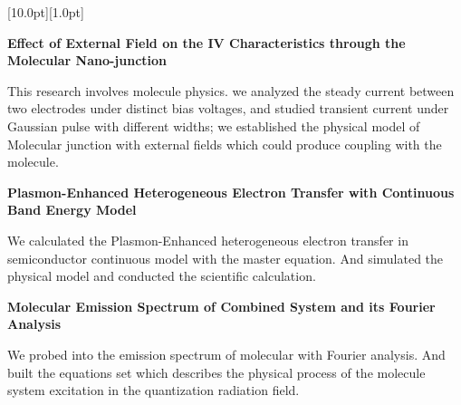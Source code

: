 \documentclass[12pt,a4paper,utf8]{report}
\begin{document}
\newpage
\begin{minipage}[t]{16cm}
    \colorbox{subtitlecolor}{\raisebox{0pt}[10.0pt][1.0pt]{
        \textcolor{white}{\textsf{}}}}
\end{minipage}\par
\vspace{0.2cm}\hspace{0.5cm}
\begin{minipage}[t]{15cm}
    {\textbf{Effect of External Field on the IV Characteristics through the Molecular Nano-junction}}\par
    \qquad\qquad\qquad\qquad\qquad{}\par
    \quad This research involves molecule physics. we analyzed the steady current between two electrodes under distinct bias voltages, and studied transient current under Gaussian pulse with different widths; we established the physical model of Molecular junction with external fields which could produce coupling with the molecule.\par
    \vspace{0.2cm}
    {\textbf{Plasmon-Enhanced Heterogeneous Electron Transfer with Continuous Band Energy Model}}\par
    \qquad\qquad\qquad\qquad\qquad{}\par
    \quad We calculated the Plasmon-Enhanced heterogeneous electron transfer in semiconductor continuous model with the master equation. And simulated the physical model and conducted the scientific calculation.\par
    \vspace{0.2cm}
    {\textbf{Molecular Emission Spectrum of Combined System and its Fourier Analysis}}\par
    \qquad\qquad\qquad\qquad\qquad{}\par
    \quad We probed into the emission spectrum of molecular with Fourier analysis. And built the equations set which describes the physical process of the molecule system excitation in the quantization radiation field.\par
\end{minipage}\par
\vspace{0.4cm}
\end{document}
